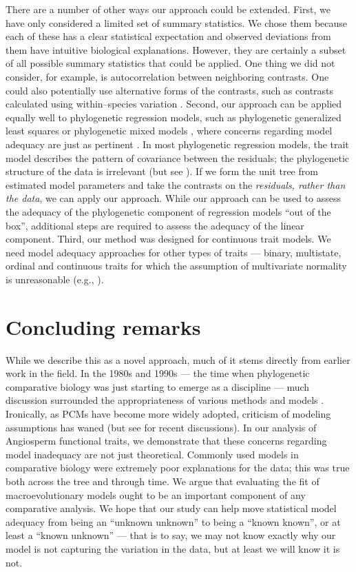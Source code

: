 \documentclass[a4paper,12pt]{article}
\begin{document}
There are a number of other ways our approach could be extended. First, we have only considered a limited set of summary statistics. We chose them because each of these has a clear statistical expectation and observed deviations from them have intuitive biological explanations. However, they are certainly a subset of all possible summary statistics that could be applied. One thing we did not consider, for example, is autocorrelation between neighboring contrasts. One could also potentially use alternative forms of the contrasts, such as contrasts calculated using within--species variation \citep{Felsenstein2008}. Second, our approach can be applied equally well to phylogenetic regression models, such as phylogenetic generalized least squares \citep{Grafen1989} or phylogenetic mixed models \citep{Lynch1991, Hadfield2010}, where concerns regarding model adequacy are just as pertinent \citep{Hansen2012}. In most phylogenetic regression models, the trait model describes the pattern of covariance between the residuals; the phylogenetic structure of the data is irrelevant \citep{Rohlf2006} (but see \citep{Hansen2008}). If we form the unit tree from estimated model parameters and take the contrasts on the \emph{residuals, rather than the data}, we can apply our approach. While our approach can be used to assess the adequacy of the phylogenetic component of regression models ``out of the box'', additional steps are required to assess the adequacy of the linear component. Third, our method was designed for continuous trait models. We need model adequacy approaches for other types of traits --- binary, multistate, ordinal and continuous traits for which the assumption of multivariate normality is unreasonable (e.g., \citep{FitzJohn2010}). 

\section{Concluding remarks}
While we describe this as a novel approach, much of it stems directly from earlier work in the field. In the 1980s and 1990s --- the time when phylogenetic comparative biology was just starting to emerge as a discipline --- much discussion surrounded the appropriateness of various methods and models \citep{Felsenstein1985, Felsenstein1988, HarveyPagel1991, Garland1992, Pagel1993, Diaz1996, Price1997, Garland1999, GarlandIves2000}. Ironically, as PCMs have become more widely adopted, criticism of modeling assumptions has waned (but see \citep{Felsenstein2012, Hansen2012} for recent discussions). In our analysis of Angiosperm functional traits, we demonstrate that these concerns regarding model inadequacy are not just theoretical. Commonly used models in comparative biology were extremely poor explanations for the data; this was true both across the tree and through time. We argue that evaluating the fit of macroevolutionary models ought to be an important component of any comparative analysis. We hope that our study can help move statistical model adequacy from being an ``unknown unknown''  to being a ``known known'', or at least a ``known unknown'' --- that is to say, we may not know exactly why our model is not capturing the variation in the data, but at least we will know it is not.
\end{document}
